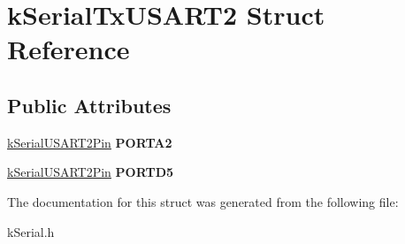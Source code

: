 \hypertarget{structkSerialTxUSART2}{}\section{k\+Serial\+Tx\+U\+S\+A\+R\+T2 Struct Reference}
\label{structkSerialTxUSART2}
\subsection*{Public Attributes}
\begin{DoxyCompactItemize}
\item 
\hyperlink{structkSerialUSART2Pin}{k\+Serial\+U\+S\+A\+R\+T2\+Pin} {\bfseries P\+O\+R\+T\+A2}\hypertarget{structkSerialTxUSART2_ac5281670499b0994eea870832576a81e}{}\label{structkSerialTxUSART2_ac5281670499b0994eea870832576a81e}

\item 
\hyperlink{structkSerialUSART2Pin}{k\+Serial\+U\+S\+A\+R\+T2\+Pin} {\bfseries P\+O\+R\+T\+D5}\hypertarget{structkSerialTxUSART2_afb3bfa0235d418792cb0ba57779f8782}{}\label{structkSerialTxUSART2_afb3bfa0235d418792cb0ba57779f8782}

\end{DoxyCompactItemize}


The documentation for this struct was generated from the following file\+:\begin{DoxyCompactItemize}
\item 
k\+Serial.\+h\end{DoxyCompactItemize}
